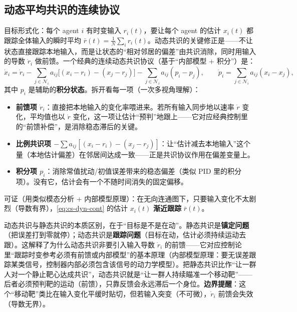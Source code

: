 \subsection{动态平均共识的连续协议}
\label{sec:cs-dyn-cont}

目标形式化：每个 agent $i$ 有时变输入 $r_i(t)$，要让每个 agent 的估计 $x_i(t)$ 都跟踪全体输入的瞬时平均 $\bar r(t)=\tfrac1N\sum_i r_i(t)$。动态共识的关键修正是——不让状态直接跟踪本地输入，而是让状态的“相对邻居的偏差”由共识消除，同时用输入的导数 $\dot r_i$ 做前馈。一个经典的连续动态共识协议（基于“内部模型 + 积分”）是：
\begin{equation}
  \dot x_i=\dot r_i-\sum_{j\in\mathcal{N}_i}a_{ij}\big[(x_i-r_i)-(x_j-r_j)\big]-\sum_{j\in\mathcal{N}_i}a_{ij}(p_i-p_j),\qquad \dot p_i=\sum_{j\in\mathcal{N}_i}a_{ij}(x_i-x_j),
  \label{eq:cs-dyn-cont}
\end{equation}
其中 $p_i$ 是辅助的\textbf{积分状态}。拆开看每一项（一次多视角理解）：
\begin{itemize}
  \item \textbf{前馈项 $\dot r_i$}：直接把本地输入的变化率喂进来。若所有输入同步地以速率 $\dot r$ 变化，平均值也以 $\dot r$ 变化，这一项让估计“预判”地跟上——它对应经典控制里的“前馈补偿”，是消除稳态滞后的关键。
  \item \textbf{比例共识项 $-\sum a_{ij}[(x_i-r_i)-(x_j-r_j)]$}：让“估计减去本地输入”这个量（本地估计偏差）在邻居间达成一致——正是共识协议作用在偏差变量上。
  \item \textbf{积分项 $p_i$}：消除常值扰动/初值误差带来的稳态偏差（类似 PID 里的积分项）。没有它，估计会有一个不随时间消失的固定偏移。
\end{itemize}
可证（用类似模态分析 + 内部模型原理）：在无向连通图下，只要输入变化不太剧烈（导数有界），\cref{eq:cs-dyn-cont} 的估计 $x_i(t)$ \textbf{渐近跟踪} $\bar r(t)$。

\begin{insight}\label{ins:cs-dyn-tracking}
动态共识与静态共识的本质区别，在于“目标是不是在动”。静态共识是\textbf{镇定问题}（把误差打到零就停）；动态共识是\textbf{跟踪问题}（目标在动，估计必须持续运动去跟）。这解释了为什么动态共识非要引入输入导数 $\dot r_i$ 的前馈——它对应控制论里“跟踪时变参考必须有前馈或内部模型”的基本原理（内部模型原理：要无误差跟踪某类信号，控制器内部必须包含该信号的动力学模型）。把静态共识比作“让一群人对一个静止靶心达成共识”，动态共识就是“让一群人持续瞄准一个移动靶”——后者必须预判靶的运动（前馈），只靠反馈会永远滞后一个身位。\textbf{边界提醒}：这个“移动靶”类比在输入变化平缓时贴切，但若输入突变（不可微），$\dot r_i$ 前馈会失效（导数无界）。
\end{insight}

